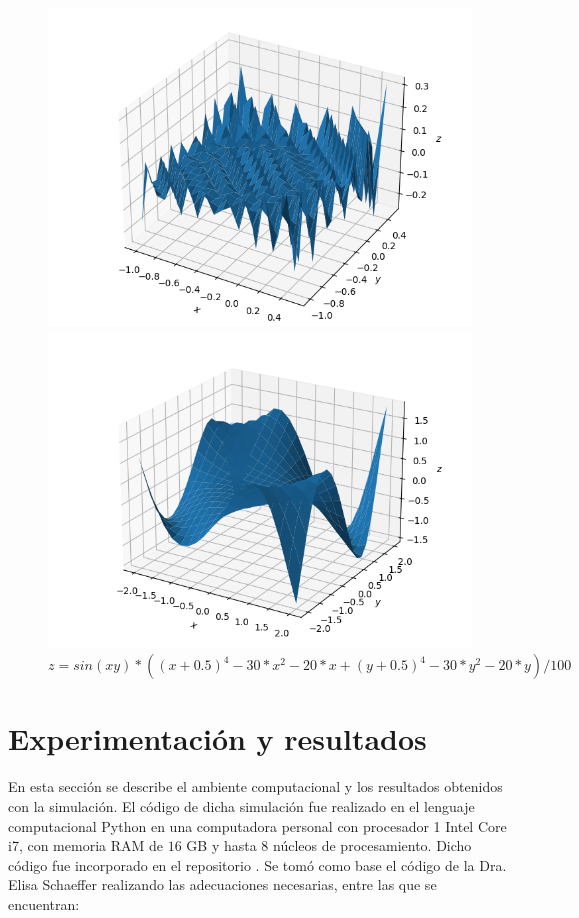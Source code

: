 \documentclass{article}
\begin{document}
	\begin{figure}[h!]
		\centering
		\includegraphics[width=0.7\linewidth]{Figure_1.png}
		\caption{$z=sin(1000*xy)*((x + 0.5)^4 - 30 * x^2 - 20 * x + (y + 0.5)^4 - 30 * y^2 - 20 * y )/100$}
		\label{fig:imagen1}
		
		\includegraphics[width=0.7\linewidth]{Figure_2.png}
		\caption{$z=sin(xy)*((x + 0.5)^4 - 30 * x^2 - 20 * x + (y + 0.5)^4 - 30 * y^2 - 20 * y )/100$}
		\label{fig:imagen2}
	\end{figure}
\newpage
\section{Experimentación y resultados}
En esta sección se describe el ambiente computacional y los resultados obtenidos con la simulación. El código de dicha simulación fue realizado en el lenguaje computacional Python en una computadora personal con procesador 1 Intel Core i7, con memoria RAM de $16$ GB y hasta $8$ núcleos de procesamiento. Dicho código fue incorporado en el repositorio \cite{p_7}.  Se tomó como base el código de la Dra. Elisa Schaeffer \cite{p7} realizando las adecuaciones necesarias, entre las que se encuentran:
\end{document}
